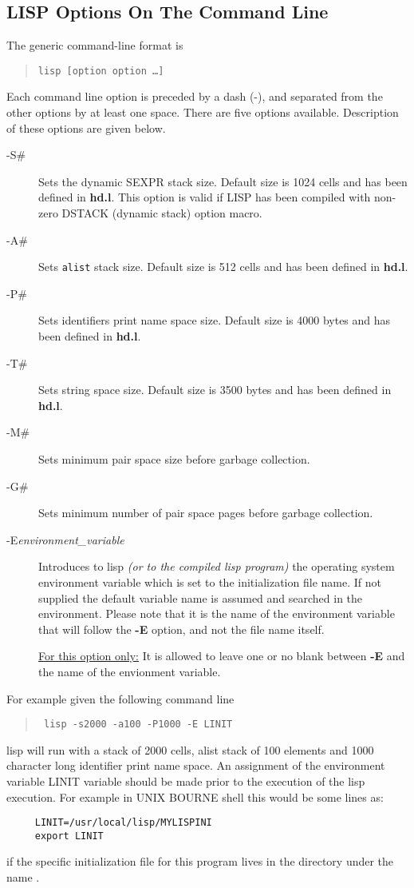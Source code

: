 \subsection{LISP Options On The Command Line}
The generic command-line format is
\begin{quote}
    {\tt  lisp [option option \ldots]}
\end{quote}
Each command line option is preceded by a dash (-), and separated from
the other options by at least one space. There are five options available.
Description of these options are given below.
\begin{description}
   \item[-S\#] Sets the dynamic SEXPR stack size. Default size is 1024 cells
       and has been defined in {\bf hd.l}.
       This option is valid if LISP has been compiled with
       non-zero DSTACK (dynamic stack) option macro.
   \item[-A\#] Sets {\tt alist} stack size. Default size is 512 cells
       and has been defined in {\bf hd.l}.
   \item[-P\#] Sets identifiers print name space size.
       Default size is 4000 bytes and has been defined in {\bf hd.l}.
   \item[-T\#] Sets string space size.
       Default size is 3500 bytes and has been defined in {\bf hd.l}.
   \item[-M\#] Sets minimum pair space size before garbage collection.
   \item[-G\#] Sets minimum number of pair space pages
       before garbage collection.
   \item[-E{\em environment\_variable}] Introduces to lisp
        {\em (or to the compiled
         lisp program)} the operating system
       environment variable which is set to the initialization file name.
       If not supplied the default variable
       name  is assumed and  searched
       in the environment.   Please note that it is the name of the
       environment variable that will follow the {\bf -E} option, and not
       the file name itself.

       \underline{For this option only:}
        It is allowed to leave one or no blank between
       {\bf -E} and the name of the envionment variable.
\end{description}
For example given the following command line
\begin{quote}    \tt
  lisp -s2000 -a100 -P1000 -E LINIT
\end{quote}
lisp will run with a stack of 2000 cells, alist stack of 100 elements and
1000 character long identifier print name space. An assignment of the
environment variable LINIT variable should be made prior to the execution
of the lisp execution. For example in UNIX BOURNE shell this would be
some lines as:
\begin{verbatim}
     LINIT=/usr/local/lisp/MYLISPINI
     export LINIT
\end{verbatim}
if the specific initialization file for this program lives in the
 directory under the name .

